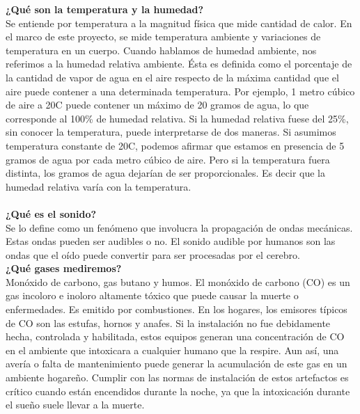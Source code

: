 \documentclass{IEEEtran}
\begin{document}
\textbf{¿Qué son la temperatura y la humedad?}\\ Se entiende por temperatura a la magnitud física que mide cantidad de calor. En el marco de este proyecto, se mide temperatura ambiente y variaciones de temperatura en un cuerpo. Cuando hablamos de humedad ambiente, nos referimos a la humedad relativa ambiente. Ésta es definida como el porcentaje de la cantidad de vapor de agua en el aire respecto de la máxima cantidad que el aire puede contener a una determinada temperatura. Por ejemplo, 1 metro cúbico de aire a 20\textordmasculine C puede contener un máximo de 20 gramos de agua, lo que corresponde al 100\% de humedad relativa. Si la humedad relativa fuese del 25\%, sin conocer la temperatura, puede interpretarse de dos maneras. Si asumimos temperatura constante de 20\textordmasculine C, podemos afirmar que estamos en presencia de 5 gramos de agua por cada metro cúbico de aire. Pero si la temperatura fuera distinta, los gramos de agua dejarían de ser proporcionales. Es decir que la humedad relativa varía con la temperatura.\\ \\

\textbf{¿Qué es el sonido?}\\ Se lo define como un fenómeno que involucra la propagación de ondas mecánicas. Estas ondas pueden ser audibles o no. 
El sonido audible por humanos son las ondas que el oído puede convertir para ser procesadas por el cerebro.\\

\textbf{¿Qué gases mediremos?}\\ Monóxido de carbono, gas butano y humos. El monóxido de carbono (CO) es un gas incoloro e inoloro altamente tóxico que puede causar la muerte o enfermedades. Es emitido por combustiones. En los hogares, los emisores típicos de CO son las estufas, hornos y anafes.  Si la instalación no fue debidamente hecha, controlada y habilitada, estos equipos generan una concentración de CO en el ambiente que intoxicara a cualquier humano que la respire. Aun así, una avería o falta de mantenimiento puede generar la acumulación de este gas en un ambiente hogareño. 
Cumplir con las normas de instalación de estos artefactos es crítico cuando están encendidos durante la noche, ya que la intoxicación durante el sueño suele llevar a la muerte. 
 
\end{document}
